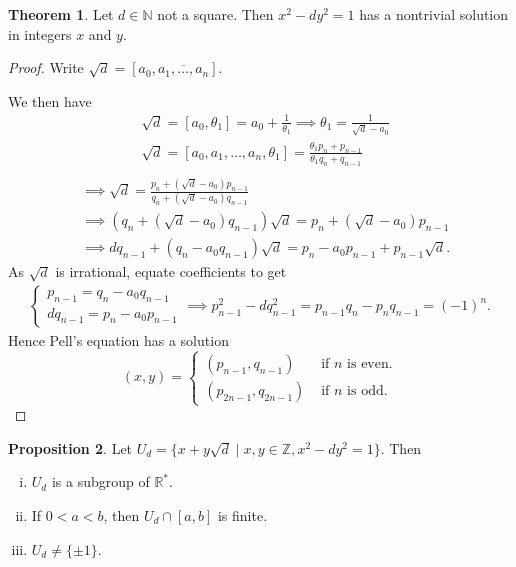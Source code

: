 \documentclass{article}
\theoremstyle{definition}
\newtheorem{theorem}{Theorem}[section]
\newtheorem{prop}[theorem]{Proposition}
\begin{document}
\begin{theorem}\label{6.12}
    Let $d \in \mathbb{N}$ not a square. Then $x^2-dy^2 =1$ has a nontrivial solution in integers $x$ and $y$.
\end{theorem}
\begin{proof}
    Write $\sqrt{d} = [a_0, \overline{a_1,\ldots,a_n}]$.
    \vspace{1mm}
    
    We then have 
    \begin{align*}
        &\sqrt{d}=[a_0,\theta_1]=a_0+\frac{1}{\theta_1} \implies \theta_1 = \frac{1}{\sqrt{d}-a_0} \\
        &\sqrt{d}=[a_0,a_1,\ldots,a_n,\theta_1]= \frac{\theta_1 p_n + p_{n-1}}{\theta_1 q_n + q_{n-1}} \\
    \end{align*}
    \begin{align*}
        &\implies \sqrt{d} = \frac{p_n + (\sqrt{d}-a_0)p_{n-1}}{q_n + (\sqrt{d}-a_0)q_{n-1}} \\
        &\implies (q_n + (\sqrt{d}-a_0)q_{n-1})\sqrt{d} = p_n + (\sqrt{d}-a_0)p_{n-1} \\
        &\implies dq_{n-1} + (q_n-a_0q_{n-1})\sqrt{d} = p_n - a_0p_{n-1} + p_{n-1}\sqrt{d}.
    \end{align*}
    As $\sqrt{d}$ is irrational, equate coefficients to get 
    \begin{align*}
        \begin{cases}
            p_{n-1} = q_n - a_0q_{n-1}\\
            dq_{n-1} = p_n - a_0p_{n-1}
        \end{cases}
        \implies p_{n-1}^2 - d q_{n-1}^2 = p_{n-1}q_n - p_n q_{n-1} =(-1)^n.
    \end{align*}
    Hence Pell's equation has a solution \[
    (x,y) = \begin{cases}
        (p_{n-1},q_{n-1}) &\text{ if }n \text{ is even.}\\
        (p_{2n-1},q_{2n-1}) &\text{ if }n \text{ is odd.}
    \end{cases}
    \]
\end{proof}
\begin{prop}
    Let $U_d = \{x+y\sqrt{d} \mid x,y \in \mathbb{Z}, x^2-dy^2 = 1\}$. Then 
    \begin{enumerate}[(i)]
        \item $U_d$ is a subgroup of $\mathbb{R}^*$.
        \item If $0<a<b$, then $U_d \cap [a,b]$ is finite.
        \item $U_d \neq \{\pm 1\}$.
    \end{enumerate}
\end{prop}
\end{document}
